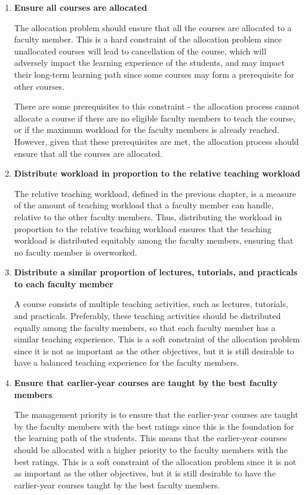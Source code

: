 \begin{enumerate}
  \item \textbf{Ensure all courses are allocated}

        The allocation problem should ensure that all the courses are allocated to a faculty member. This is a hard constraint of the allocation problem since unallocated courses will lead to cancellation of the course, which will adversely impact the learning experience of the students, and may impact their long-term learning path since some courses may form a prerequisite for other courses.

        There are some prerequisites to this constraint - the allocation process cannot allocate a course if there are no eligible faculty members to teach the course, or if the maximum workload for the faculty members is already reached. However, given that these prerequisites are met, the allocation process should ensure that all the courses are allocated.

  \item \textbf{Distribute workload in proportion to the relative teaching workload}

        The relative teaching workload, defined in the previous chapter, is a measure of the amount of teaching workload that a faculty member can handle, relative to the other faculty members. Thus, distributing the workload in proportion to the relative teaching workload ensures that the teaching workload is distributed equitably among the faculty members, ensuring that no faculty member is overworked.

  \item \textbf{Distribute a similar proportion of lectures, tutorials, and practicals to each faculty member}

        A course consists of multiple teaching activities, such as lectures, tutorials, and practicals. Preferably, these teaching activities should be distributed equally among the faculty members, so that each faculty member has a similar teaching experience. This is a soft constraint of the allocation problem since it is not as important as the other objectives, but it is still desirable to have a balanced teaching experience for the faculty members.

  \item \textbf{Ensure that earlier-year courses are taught by the best faculty members}

        The management priority is to ensure that the earlier-year courses are taught by the faculty members with the best ratings since this is the foundation for the learning path of the students. This means that the earlier-year courses should be allocated with a higher priority to the faculty members with the best ratings. This is a soft constraint of the allocation problem since it is not as important as the other objectives, but it is still desirable to have the earlier-year courses taught by the best faculty members.


\end{enumerate}

